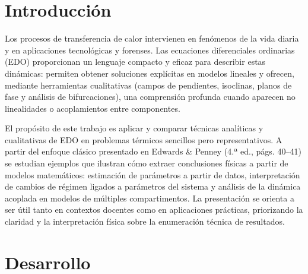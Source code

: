 \documentclass[a4paper,10pt]{article}
\begin{document}
\newpage


\section{Introducción}\label{sec:intro}
	Los procesos de transferencia de calor intervienen en fenómenos de la vida
	diaria y en aplicaciones tecnológicas y forenses. Las ecuaciones diferenciales
	ordinarias (EDO) proporcionan un lenguaje compacto y eficaz para describir
	estas dinámicas: permiten obtener soluciones explícitas en modelos lineales y
	ofrecen, mediante herramientas cualitativas (campos de pendientes, isoclinas,
	planos de fase y análisis de bifurcaciones), una comprensión profunda cuando
	aparecen no linealidades o acoplamientos entre componentes.

	El propósito de este trabajo es aplicar y comparar técnicas analíticas y
	cualitativas de EDO en problemas térmicos sencillos pero representativos. A
	partir del enfoque clásico presentado en Edwards \& Penney (4.ª ed., págs.
	40--41) se estudian ejemplos que ilustran cómo extraer conclusiones físicas a
	partir de modelos matemáticos: estimación de parámetros a partir de datos,
	interpretación de cambios de régimen ligados a parámetros del sistema y
	análisis de la dinámica acoplada en modelos de múltiples compartimentos. La
	presentación se orienta a ser útil tanto en contextos docentes como en
	aplicaciones prácticas, priorizando la claridad y la interpretación física
	sobre la enumeración técnica de resultados.




\section{Desarrollo}\label{sec:dev}
\end{document}
